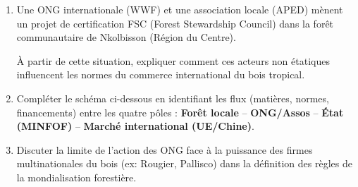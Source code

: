 \documentclass[11pt]{article}
\begin{document}
\begin{exercice}
\begin{enumerate}
    \item Une ONG internationale (WWF) et une association locale (APED) mènent un projet de certification FSC (Forest Stewardship Council) dans la forêt communautaire de Nkolbisson (Région du Centre). 
    
    À partir de cette situation, expliquer comment ces acteurs non étatiques influencent les normes du commerce international du bois tropical.
    \item Compléter le schéma ci-dessous en identifiant les flux (matières, normes, financements) entre les quatre pôles : \textbf{Forêt locale} -- \textbf{ONG/Assos} -- \textbf{État (MINFOF)} -- \textbf{Marché international (UE/Chine)}.
    
    \begin{center}
    \end{center}
    \item Discuter la limite de l'action des ONG face à la puissance des firmes multinationales du bois (ex: Rougier, Pallisco) dans la définition des règles de la mondialisation forestière.
\end{enumerate}
\end{exercice}
\end{document}
